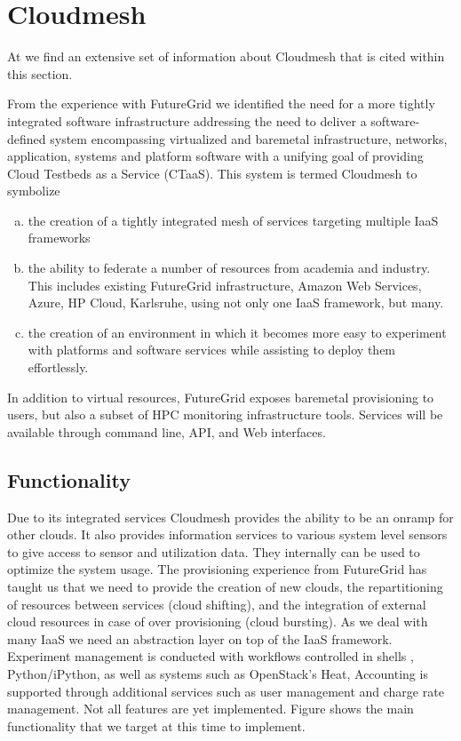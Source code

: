\documentclass[graybox]{svmult}
\begin{document}
\section{Cloudmesh}\label{S:cloudmesh}

At \cite{github-cloudmesh} we find an extensive set of information about Cloudmesh that is cited within this section. 

From the experience with FutureGrid we identified the need for a more tightly integrated software infrastructure addressing the need to deliver a software-defined system encompassing virtualized and baremetal infrastructure, networks, application, systems and platform software with a unifying goal of providing Cloud Testbeds as a Service (CTaaS). This system is termed Cloudmesh to symbolize 

\begin{enumerate}[(a)]

\item the creation of a tightly integrated mesh of services targeting multiple IaaS frameworks 

\item the ability to federate a number of resources from academia and industry. This includes existing FutureGrid infrastructure, Amazon Web Services, Azure, HP Cloud, Karlsruhe, using not only one IaaS framework, but many. 

\item the creation of an environment in which it becomes more easy to experiment with platforms and software services while assisting to deploy them effortlessly.  

\end{enumerate}

In addition to virtual resources, FutureGrid exposes baremetal provisioning to users, but also a subset of HPC monitoring infrastructure tools. Services will be available through command line, API, and Web interfaces.

\subsection{Functionality}

Due to its integrated services Cloudmesh provides the ability to be an onramp for other clouds. It also provides information services to various system level sensors to give access to sensor and utilization data. They internally can be used to optimize the system usage. The provisioning experience from FutureGrid has taught us that we need to provide the creation of new clouds, the repartitioning of resources between services (cloud shifting), and the integration of external cloud resources in case of over provisioning (cloud bursting). As we deal with many IaaS we need an abstraction layer on top of the IaaS framework. Experiment management is conducted with workflows controlled in shells \cite{cmd3}, Python/iPython, as well as systems such as OpenStack’s Heat, Accounting is supported through additional services such as user management and charge rate management. Not all features are yet implemented. Figure \label{F:cm-func} shows the main functionality that we target at this time to implement.
\end{document}
